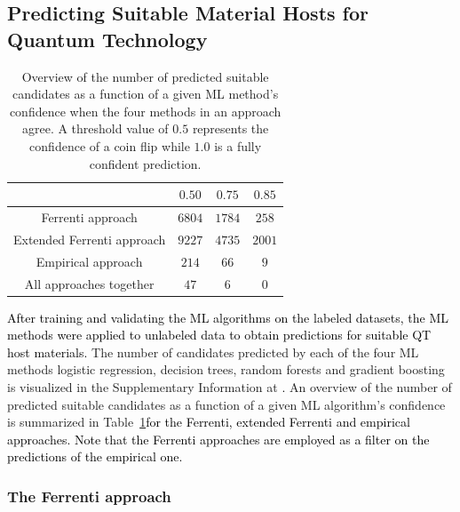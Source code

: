 \documentclass[superscriptaddress,unsortedaddress,
 amsmath,amssymb,
 aps,
]{revtex4-2}
\newcommand{\mrk}[1]{\textcolor{black}{#1}}
\begin{document}
\subsection*{Predicting Suitable Material Hosts for Quantum Technology} 

\begin{table}[b]
    \centering 
    \caption{Overview of the number of predicted suitable candidates as a function of a given ML method's confidence when the four methods in an approach agree. A threshold value of $0.5$ represents the confidence of a coin flip while $1.0$ is a fully confident prediction.}
    \begin{tabular}{c|c|c|c}
      & $0.50$ & $0.75$ & $0.85$ \\
     \hline
     Ferrenti approach &  $6804$ & $1784$ & $258$  \\
     Extended Ferrenti approach &  $9227$ & $4735$  & $2001$  \\ 
     Empirical approach & $214$ & $66$ & $9$ \\
     \hline
     All approaches together & $47$ & $6$ & 0 \\
    \end{tabular}
    \label{tab:probabilites}
\end{table} 


\mrk{After training and validating the ML algorithms on the labeled datasets, the ML methods were applied to unlabeled data to obtain predictions for suitable QT host materials.} 
The number of candidates predicted by each of the four ML methods logistic regression, decision trees, random forests and gradient boosting is visualized in the Supplementary Information at \cite{supplementary}\mrk{.} %
An overview of the number of predicted suitable candidates as a function of a given ML algorithm's confidence is summarized in Table~\ref{tab:probabilites}\mrk{for the Ferrenti, extended Ferrenti and empirical approaches. Note that the Ferrenti approaches are employed as a filter on the predictions of the empirical one.} 

\subsubsection*{The Ferrenti approach}
\end{document}
